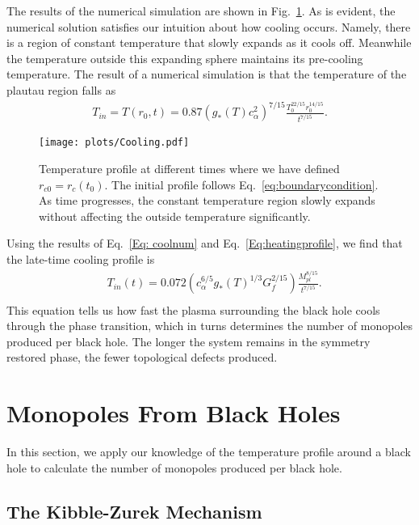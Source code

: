 \documentclass[superscriptaddress,groupedaddress,nofootnoteinbib,11pt]{article}
\newcommand\eea{\end{eqnarray}}
\newcommand\bea{\begin{eqnarray}}
\newcommand{\mpl}{M_{pl}}
\def\l{\left(}
\def\r{\right)}
\begin{document}
The results of the numerical simulation are shown in Fig.~\ref{fig: cooling}.  As is evident, the numerical solution satisfies our intuition about how cooling occurs.  Namely, there is a region of constant temperature that slowly expands as it cools off.  Meanwhile  the temperature outside this expanding sphere maintains its pre-cooling temperature.
The result of a numerical simulation is that the temperature of the plautau region falls as
\bea
T_{in} = T(r_0,t) = 0.87\l g_*(T)c_{\alpha}^2\r^{7/15} \frac{T_0^{22/15} r_0^{14/15}}{t^{7/15}}.
\label{Eq: coolnum}
\eea

\begin{figure}[t]
    \centering
    \texttt{[image: plots/Cooling.pdf]}
    \caption{Temperature profile at different times where we have defined $r_{c0}=r_c(t_0)$. The initial profile follows Eq.~\ref{eq:boundarycondition}. As time progresses, the constant temperature region slowly expands without affecting the outside temperature significantly.}
    \label{fig: cooling}
\end{figure}

Using the results of Eq.~\ref{Eq: coolnum} and Eq.~\ref{Eq:heatingprofile}, we find that the late-time cooling profile is
\begin{equation}
    \begin{split}
        \label{eq:numcooling}
        &T_{in}(t) =0.072\l c_{\alpha} ^{6/5}g_*(T)^{1/3} G_f^{2/15}\r \frac{\mpl^{8/15}}{t^{7/15}} . \\
    \end{split}
\end{equation}
This equation tells us how fast the plasma surrounding the black hole cools through the phase transition, which in turns determines the number of monopoles produced per black hole.  The longer the system remains in the symmetry restored phase, the fewer topological defects produced. 


\section{Monopoles From Black Holes} \label{Sec: monopoles}

In this section, we apply our knowledge of the temperature profile around a black hole to calculate the number of monopoles produced per black hole.


\subsection{The Kibble-Zurek Mechanism}
\end{document}
